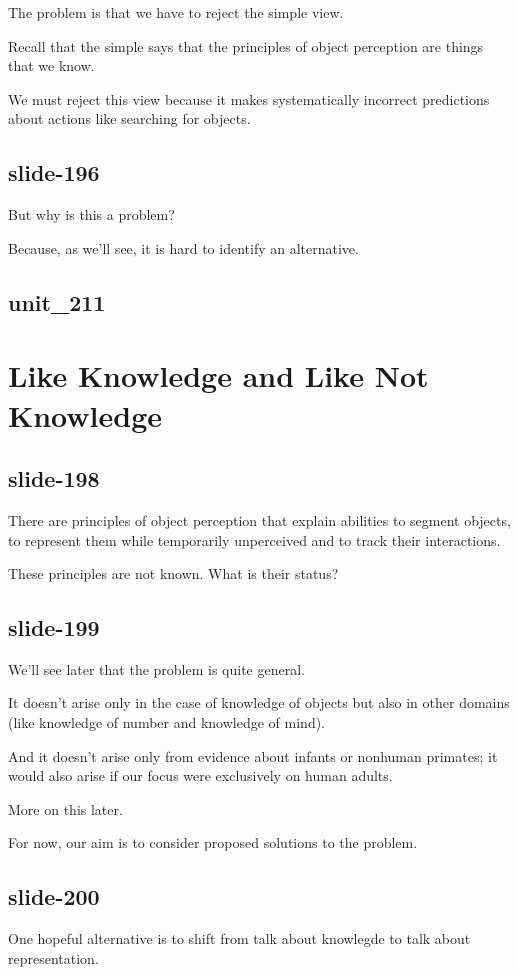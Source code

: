 \documentclass[12pt,\papersize]{extarticle}
\begin{document}
The problem is that we have to reject the simple view.
 
Recall that the simple says that the principles of object perception are things that we know.
 
We must reject this view because it makes systematically incorrect predictions about actions like searching for objects.
 
\subsection{slide-196}
But why is this a problem?
 
Because, as we'll see, it is hard to identify an alternative.
 
\subsection{unit\_211}
 
 
\section{Like Knowledge and Like Not Knowledge}
 
\subsection{slide-198}
There are principles of object perception that explain abilities to segment objects, to represent them while temporarily unperceived and to track their interactions.
 
These principles are not known.  What is their status?
 
\subsection{slide-199}
We'll see later that the problem is quite general.
 
It doesn't arise only in the case of knowledge of objects but also in other domains (like knowledge of number and knowledge of mind).
 
And it doesn't arise only from evidence about infants or nonhuman primates; it would also arise if our focus were exclusively on human adults.
 
More on this later.
 
For now, our aim is to consider proposed solutions to the problem.
 
\subsection{slide-200}
One hopeful alternative is to shift from talk about knowlegde to talk about representation.
 
\end{document}
